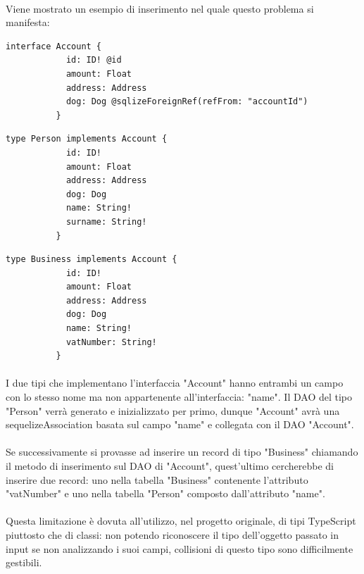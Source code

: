 \documentclass[a4paper, 12pt]{report}
\begin{document}
        \paragraph*{}
        Viene mostrato un esempio di inserimento nel quale questo problema si manifesta:
        \begin{Verbatim}[samepage=true]
          interface Account {
            id: ID! @id
            amount: Float
            address: Address
            dog: Dog @sqlizeForeignRef(refFrom: "accountId")
          }
        \end{Verbatim}
        \begin{Verbatim}[samepage=true]
          type Person implements Account {
            id: ID!
            amount: Float
            address: Address
            dog: Dog
            name: String!
            surname: String!
          }
        \end{Verbatim}
        \begin{Verbatim}[samepage=true]
          type Business implements Account {
            id: ID!
            amount: Float
            address: Address
            dog: Dog
            name: String!
            vatNumber: String!
          }
        \end{Verbatim}
        \paragraph*{}
        I due tipi che implementano l'interfaccia "Account" hanno entrambi un campo con lo stesso nome ma non appartenente all'interfaccia: "name".
        Il DAO del tipo "Person" verrà generato e inizializzato per primo, dunque "Account" avrà una sequelizeAssociation basata sul campo "name" e collegata con il DAO "Account".
        \paragraph*{}
        Se successivamente si provasse ad inserire un record di tipo "Business" chiamando il metodo di inserimento sul DAO di "Account", quest'ultimo cercherebbe di inserire due record: uno nella tabella "Business" contenente l'attributo "vatNumber" e uno nella tabella "Person" composto dall'attributo "name".
        \paragraph*{}
        Questa limitazione è dovuta all'utilizzo, nel progetto originale, di tipi TypeScript piuttosto che di classi: non potendo riconoscere il tipo dell'oggetto passato in input se non analizzando i suoi campi, collisioni di questo tipo sono difficilmente gestibili.
\end{document}
